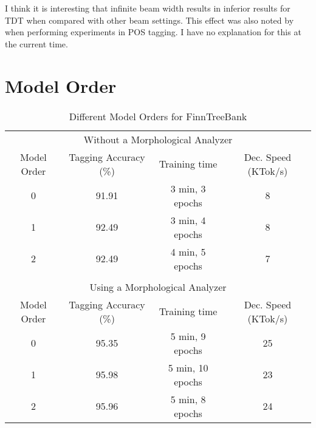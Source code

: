I think it is interesting that infinite beam width results in inferior
results for TDT when compared with other beam settings. This effect
was also noted by \cite{Huang2012} when performing experiments in POS
tagging. I have no explanation for this at the current time.

\section{Model Order}

\begin{table}[htb!]
\begin{center}
\begin{tabular}{cccc}
\multicolumn{4}{c}{Without a Morphological Analyzer}\\
Model Order & Tagging Accuracy (\%) & Training time & Dec. Speed (KTok/s)\\
\hline
0        & 91.91            & 3 min, 3 epochs            & 8            \\
1        & 92.49            & 3 min, 4 epochs            & 8            \\
2        & 92.49            & 4 min, 5 epochs            & 7            \\
                &                       &                  &            \\
\multicolumn{4}{c}{Using a Morphological Analyzer}\\
Model Order & Tagging Accuracy (\%) & Training time & Dec. Speed (KTok/s)\\
\hline
0        & 95.35            & 5 min, 9 epochs            & 25            \\
1        & 95.98            & 5 min, 10 epochs           & 23            \\
2        & 95.96            & 5 min, 8 epochs            & 24            \\
\end{tabular}
\caption{Different Model Orders for FinnTreeBank}
\end{center}
\end{table}

